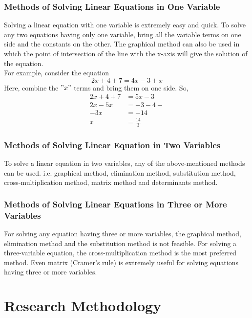 \documentclass[a4paper, 12pt]{report}
\begin{document}
{      \subsection{Methods of Solving Linear Equations in One Variable}
Solving a linear equation with one variable is extremely easy and quick. To solve any two equations having only one variable, bring all the variable terms on one side and the constants on the other. The graphical method can also be used in which the point of intersection of the line with the x-axis will give the solution of the equation.\\
      For example, consider the equation\\
      \begin{equation*}
       2x+4+7= 4x-3+x
       \end{equation*}
      Here, combine the $"x"$ terms and bring them on one side.
      So,
      \begin{align*}
      2x+4+7 &= 5x-3\\
      2x-5x &= -3-4-\\
      -3x &= -14\\
      x&= \frac{14}{3}
      \end{align*}          
      \subsection{Methods of Solving Linear Equation in Two Variables}
      To solve a linear equation in two variables, any of the above-mentioned methods can be used. i.e. graphical method, elimination method, substitution method, cross-multiplication method, matrix method and determinants method.\\
      
\subsection{Methods of Solving Linear Equations in Three or More Variables}
      For solving any equation having three or more variables, the graphical method, elimination method and the substitution method is not feasible. For solving a three-variable equation, the cross-multiplication method is the most preferred method. Even matrix (Cramer's rule) is extremely useful for solving equations having three or more variables.\\
      
     \chapter{Research Methodology}
}
\end{document}
